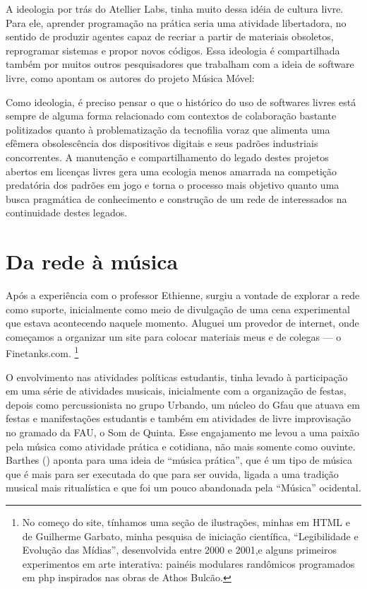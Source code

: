 A ideologia por trás do Atellier Labs, tinha muito dessa idéia de cultura livre. Para ele, aprender programação na prática seria uma atividade libertadora, no sentido de produzir agentes capaz de recriar a partir de materiais obsoletos, reprogramar sistemas e propor novos códigos. Essa ideologia é compartilhada também por muitos outros pesquisadores que trabalham com a ideia de software livre, como apontam os autores do projeto Música Móvel:

\begin{citacao}
Como ideologia, é preciso pensar o que o histórico do uso de softwares livres está sempre de alguma forma relacionado com contextos de colaboração bastante politizados quanto à problematização da tecnofilia voraz que alimenta uma efêmera obsolescência dos dispositivos digitais e seus padrões industriais concorrentes. A manutenção e compartilhamento do legado destes projetos abertos em licenças livres gera uma ecologia menos amarrada na competição predatória dos padrões em jogo e torna o processo mais objetivo quanto uma busca pragmática de conhecimento e construção de um rede de interessados na continuidade destes legados.\cite{Rohde2014}
\end{citacao}



\section{Da rede à música}
Após a experiência com o professor Ethienne, surgiu a vontade de explorar a rede como suporte, inicialmente como meio de divulgação de uma cena experimental que estava acontecendo naquele momento. Aluguei um provedor de internet, onde começamos a organizar um site para colocar materiais meus e de colegas --- o Finetanks.com. \footnote{No começo do site, tínhamos uma seção de ilustrações, minhas em HTML e de Guilherme Garbato, minha pesquisa de iniciação científica, ``Legibilidade e Evolução das Mídias'', desenvolvida entre 2000 e 2001,e alguns primeiros experimentos em arte interativa: painéis modulares randômicos programados em php inspirados nas obras de Athos Bulcão.}


O envolvimento nas atividades políticas estudantis, tinha levado à participação em uma série de atividades musicais, inicialmente com a organização de festas, depois como percussionista no grupo Urbando, um núcleo do Gfau que atuava em festas e manifestações estudantis e também em atividades de livre improvisação no gramado da FAU, o Som de Quinta. Esse engajamento me levou a uma paixão pela música como atividade prática e cotidiana, não mais somente como ouvinte. Barthes (\citeyear{Barthes1978}) aponta para uma ideia de ``música prática'', que é um tipo de música que é mais para ser executada do que para ser ouvida, ligada a uma tradição musical mais ritualística e que foi um pouco abandonada pela ``Música'' ocidental. 

